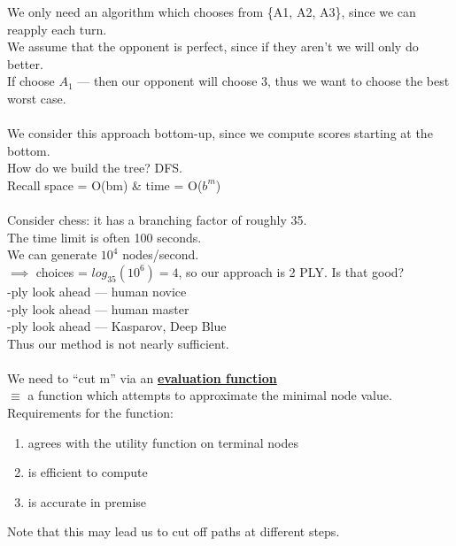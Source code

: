 \documentclass[../../lecture_notes.tex]{subfiles}
\begin{document}
\noindent We only need an algorithm which chooses from \{A1, A2, A3\}, since we can reapply each turn.\\
We assume that the opponent is perfect, since if they aren’t we will only do better.\\
If choose $A_1$ — then our opponent will choose 3, thus we want to choose the best worst case.\\
\\
We consider this approach bottom-up, since we compute scores starting at the bottom.\\
How do we build the tree?  DFS.\\
Recall space = O(bm) \& time = O($b^m$)\\
\\
Consider chess: it has a branching factor of roughly 35.\\
The time limit is often 100 seconds.\\
We can generate $10^4$ nodes/second.\\
$\implies$ choices = $log_35(10^6) = 4$, so our approach is 2 PLY.
Is that good?\\
-ply look ahead — human novice\\
-ply look ahead — human master\\
-ply look ahead — Kasparov, Deep Blue\\
Thus our method is not nearly sufficient.\\
\\
We need to “cut m” via an \textbf{\underline{evaluation function}}\\
\indent $\equiv$ a function which attempts to approximate the minimal node value.\\
Requirements for the function:
\begin{enumerate} [itemsep=0mm]
	\item agrees with the utility function on terminal nodes
	\item is efficient to compute
	\item is accurate in premise
\end{enumerate}
\noindent Note that this may lead us to cut off paths at different steps.
\end{document}
